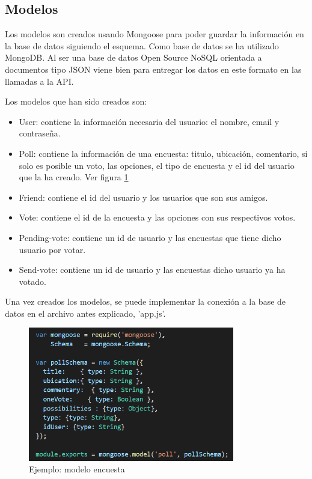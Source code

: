 \documentclass[a4paper, 12pt]{book}
\begin{document}
\subsection{Modelos} 
\label{sec:modelos}

Los modelos son creados usando Mongoose para poder guardar la informaci\'on en la base de datos siguiendo el esquema. Como base de datos se ha utilizado MongoDB. Al ser una base de datos Open Source NoSQL orientada a documentos tipo JSON viene bien para entregar los datos en este formato en las llamadas a la API. 

Los modelos que han sido creados son:
\begin{itemize}
\item User: contiene la informaci\'on necesaria del usuario: el nombre, email y contrase\~na.
\item Poll: contiene la informaci\'on de una encuesta: titulo, ubicaci\'on, comentario, si solo es posible un voto, las opciones, el tipo de encuesta y el id del usuario que la ha creado. Ver figura \ref{f:ej_model}
\item Friend: contiene el id del usuario y los usuarios que son sus amigos.
\item Vote: contiene el id de la encuesta y las opciones con sus respectivos votos.
\item Pending-vote: contiene un id de usuario y las encuestas que tiene dicho usuario por votar.
\item Send-vote: contiene un id de usuario y las encuestas dicho usuario ya ha votado. 
\end{itemize}

Una vez creados los modelos, se puede implementar la conexi\'on a la base de datos en el archivo antes explicado, 'app.js'.

\begin{figure}[H]
  \centering
  \includegraphics[width=9cm, keepaspectratio]{img/model.png}
  \caption{Ejemplo: modelo encuesta}
  \label{f:ej_model}
\end{figure}
\end{document}
